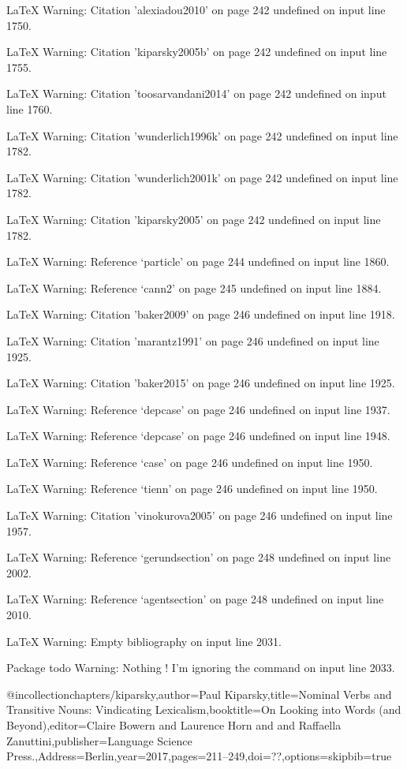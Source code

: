 LaTeX Warning: Citation 'alexiadou2010' on page 242 undefined on input line 1750.


LaTeX Warning: Citation 'kiparsky2005b' on page 242 undefined on input line 1755.


LaTeX Warning: Citation 'toosarvandani2014' on page 242 undefined on input line 1760.


LaTeX Warning: Citation 'wunderlich1996k' on page 242 undefined on input line 1782.


LaTeX Warning: Citation 'wunderlich2001k' on page 242 undefined on input line 1782.


LaTeX Warning: Citation 'kiparsky2005' on page 242 undefined on input line 1782.


LaTeX Warning: Reference `particle' on page 244 undefined on input line 1860.


LaTeX Warning: Reference `cann2' on page 245 undefined on input line 1884.


LaTeX Warning: Citation 'baker2009' on page 246 undefined on input line 1918.


LaTeX Warning: Citation 'marantz1991' on page 246 undefined on input line 1925.


LaTeX Warning: Citation 'baker2015' on page 246 undefined on input line 1925.


LaTeX Warning: Reference `depcase' on page 246 undefined on input line 1937.


LaTeX Warning: Reference `depcase' on page 246 undefined on input line 1948.


LaTeX Warning: Reference `case' on page 246 undefined on input line 1950.


LaTeX Warning: Reference `tienn' on page 246 undefined on input line 1950.


LaTeX Warning: Citation 'vinokurova2005' on page 246 undefined on input line 1957.


LaTeX Warning: Reference `gerundsection' on page 248 undefined on input line 2002.


LaTeX Warning: Reference `agentsection' on page 248 undefined on input line 2010.


LaTeX Warning: Empty bibliography on input line 2031.


Package todo Warning: Nothing \todo! I'm ignoring the \todos command on input line 2033.

@incollection{chapters/kiparsky,author={Paul Kiparsky},title={{Nominal Verbs and Transitive Nouns: Vindicating Lexicalism}},booktitle={{On Looking into Words (and Beyond)}},editor={Claire Bowern and  Laurence Horn and  and Raffaella Zanuttini},publisher={Language Science Press.},Address={Berlin},year=2017,pages={211--249},doi={??},options={skipbib=true}}

